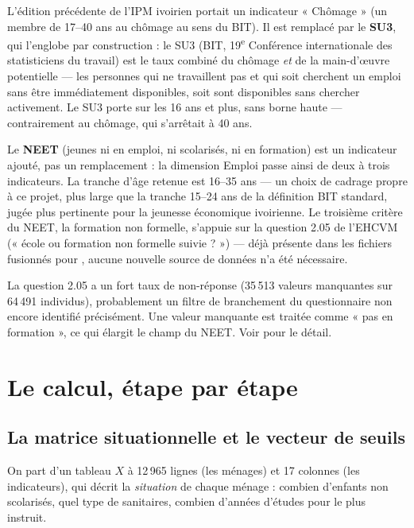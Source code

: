 \documentclass[11pt,a4paper]{article}
\begin{document}
L'édition précédente de l'IPM ivoirien portait un indicateur « Chômage » (un membre de 17--40 ans
au chômage au sens du BIT). Il est remplacé par le \textbf{SU3}, qui l'englobe par construction :
le SU3 (BIT, 19\textsuperscript{e} Conférence internationale des statisticiens du travail) est le
taux combiné du chômage \emph{et} de la main-d'œuvre potentielle --- les personnes qui ne
travaillent pas et qui soit cherchent un emploi sans être immédiatement disponibles, soit sont
disponibles sans chercher activement. Le SU3 porte sur les 16 ans et plus, sans borne haute ---
contrairement au chômage, qui s'arrêtait à 40 ans.

Le \textbf{NEET} (jeunes ni en emploi, ni scolarisés, ni en formation) est un indicateur ajouté,
pas un remplacement : la dimension Emploi passe ainsi de deux à trois indicateurs. La tranche
d'âge retenue est 16--35 ans --- un choix de cadrage propre à ce projet, plus large que la
tranche 15--24 ans de la définition BIT standard, jugée plus pertinente pour la jeunesse
économique ivoirienne. Le troisième critère du NEET, la formation non formelle, s'appuie sur la
question 2.05 de l'EHCVM (« école ou formation non formelle suivie ? ») --- déjà présente dans les
fichiers fusionnés pour , aucune nouvelle source de données n'a été
nécessaire.

\begin{attention}
La question 2.05 a un fort taux de non-réponse (35\,513 valeurs manquantes sur 64\,491
individus), probablement un filtre de branchement du questionnaire non encore identifié
précisément. Une valeur manquante est traitée comme « pas en formation », ce qui élargit le champ
du NEET. Voir  pour le détail.
\end{attention}

\section{Le calcul, étape par étape}

\subsection{La matrice situationnelle et le vecteur de seuils}

On part d'un tableau $X$ à 12\,965 lignes (les ménages) et 17 colonnes (les indicateurs), qui
décrit la \emph{situation} de chaque ménage : combien d'enfants non scolarisés, quel type de
sanitaires, combien d'années d'études pour le plus instruit.
\end{document}
